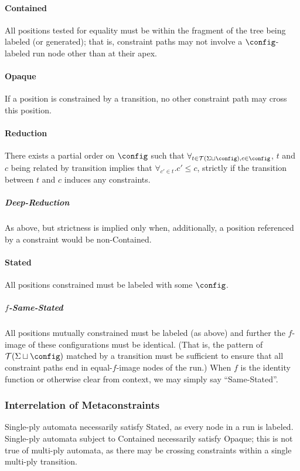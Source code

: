 \paragraph{Contained} All positions tested for equality must be within the
fragment of the tree being labeled (or generated); that is, constraint paths
may not involve a $\config$-labeled run node other than at their apex.

\paragraph{Opaque} If a position is constrained by a transition, no other
constraint path may cross this position. 

\paragraph{Reduction} There exists a partial order on $\config$ such that
$\forall_{t \in \mathcal{T}(\Sigma \sqcup \config), c \in \config}$, $t$ and
$c$ being related by transition implies that $\forall_{c' \in t} . c' \le
c$, strictly if the transition between $t$ and $c$ induces any constraints.

\subparagraph{Deep-Reduction} As above, but strictness is implied only when,
additionally, a position referenced by a constraint would be non-Contained.

\paragraph{Stated} All positions constrained must be labeled with some 
$\config$.

\subparagraph{$f$-Same-Stated} All positions mutually constrained must be
labeled (as above) and further the $f$-image of these configurations must be
identical.  (That is, the pattern of $\mathcal{T}(\Sigma \sqcup \config)$
matched by a transition must be sufficient to ensure that all constraint
paths end in equal-$f$-image nodes of the run.)  When $f$ is the identity
function or otherwise clear from context, we may simply say ``Same-Stated''.

\subsubsection{Interrelation of Metaconstraints}

Single-ply automata necessarily satisfy Stated, as every node in a run is
labeled.  Single-ply automata subject to Contained necessarily satisfy
Opaque; this is not true of multi-ply automata, as there may be crossing
constraints within a single multi-ply transition.

